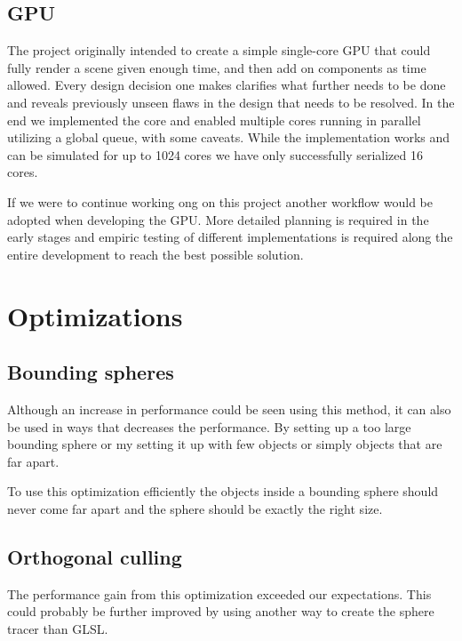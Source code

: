 		
		\subsection{GPU} 
		
			The project originally intended to create a simple single-core GPU
			that could fully render a scene given enough time, and then add on
			components as time allowed. Every design decision one makes clarifies what further needs to be done and reveals previously unseen flaws in the design that needs
			to be resolved. In the end we implemented the core and enabled
			multiple cores running in parallel utilizing a global queue, with
			some caveats. While the implementation works and can be simulated
			for up to 1024 cores we have only successfully serialized 16 cores. 
			
            If we were to continue working ong on this project another workflow
            would be adopted when developing the GPU. More detailed planning is 
            required in the early stages and empiric testing of different 
            implementations is required along the entire development to reach
            the best possible solution.


	\section{Optimizations} \label{optimization}

		\subsection{Bounding spheres}
			
			Although an increase in performance could be seen using this
			method, it can also be used in ways that decreases the performance.
			By setting up a too large bounding sphere or my setting it up with
			few objects or simply objects that are far apart.

			To use this optimization efficiently the objects inside a bounding 
			sphere should never come far apart and the sphere should be exactly 
			the right size.

		\subsection{Orthogonal culling}

			The performance gain from this optimization exceeded our 
			expectations. This could probably be further improved by using
			another way to create the sphere tracer than GLSL. 

